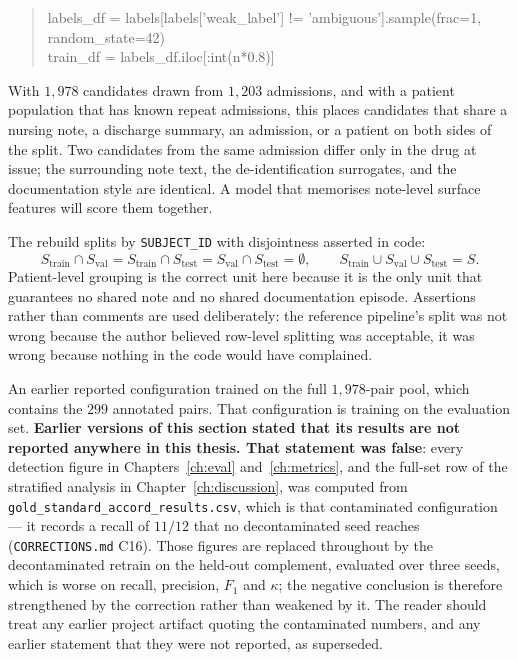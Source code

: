\begin{quote}\ttfamily\small
labels\_df = labels[labels['weak\_label'] != 'ambiguous'].sample(frac=1, random\_state=42) \\
train\_df = labels\_df.iloc[:int(n*0.8)]
\end{quote}

With $1{,}978$ candidates drawn from $1{,}203$ admissions, and with a patient
population that has known repeat admissions, this places candidates that share a
nursing note, a discharge summary, an admission, or a patient on both sides of
the split. Two candidates from the same admission differ only in the drug at
issue; the surrounding note text, the de-identification surrogates, and the
documentation style are identical. A model that memorises note-level surface
features will score them together.

The rebuild splits by \texttt{SUBJECT\_ID} with disjointness asserted in code:
\[
S_{\text{train}} \cap S_{\text{val}} = S_{\text{train}} \cap S_{\text{test}}
= S_{\text{val}} \cap S_{\text{test}} = \emptyset,
\qquad
S_{\text{train}} \cup S_{\text{val}} \cup S_{\text{test}} = S .
\]
Patient-level grouping is the correct unit here because it is the only unit that
guarantees no shared note and no shared documentation episode. Assertions rather
than comments are used deliberately: the reference pipeline's split was not
wrong because the author believed row-level splitting was acceptable, it was
wrong because nothing in the code would have complained.

An earlier reported configuration trained on the full $1{,}978$-pair pool, which
contains the $299$ annotated pairs. That configuration is training on the
evaluation set. \textbf{Earlier versions of this section stated that its results
are not reported anywhere in this thesis. That statement was false}: every
detection figure in Chapters~\ref{ch:eval} and~\ref{ch:metrics}, and the full-set
row of the stratified analysis in Chapter~\ref{ch:discussion}, was computed from
\texttt{gold\_standard\_accord\_results.csv}, which is that contaminated
configuration --- it records a recall of $11/12$ that no decontaminated seed
reaches (\texttt{CORRECTIONS.md} C16). Those figures are replaced throughout by
the decontaminated retrain on the held-out complement, evaluated over three
seeds, which is worse on recall, precision, $F_1$ and $\kappa$; the negative
conclusion is therefore strengthened by the correction rather than weakened by
it. The reader should treat any earlier project artifact quoting the contaminated
numbers, and any earlier statement that they were not reported, as superseded.

